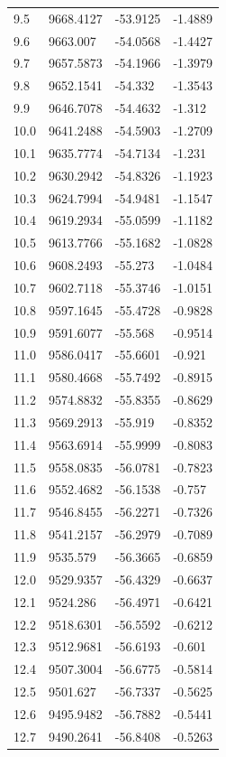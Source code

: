 \begin{table}[H]
\begin{tabular}{llll}
9.5 & 9668.4127 & -53.9125 & -1.4889 \\
9.6 & 9663.007 & -54.0568 & -1.4427 \\
9.7 & 9657.5873 & -54.1966 & -1.3979 \\
9.8 & 9652.1541 & -54.332 & -1.3543 \\
9.9 & 9646.7078 & -54.4632 & -1.312 \\
10.0 & 9641.2488 & -54.5903 & -1.2709 \\
10.1 & 9635.7774 & -54.7134 & -1.231 \\
10.2 & 9630.2942 & -54.8326 & -1.1923 \\
10.3 & 9624.7994 & -54.9481 & -1.1547 \\
10.4 & 9619.2934 & -55.0599 & -1.1182 \\
10.5 & 9613.7766 & -55.1682 & -1.0828 \\
10.6 & 9608.2493 & -55.273 & -1.0484 \\
10.7 & 9602.7118 & -55.3746 & -1.0151 \\
10.8 & 9597.1645 & -55.4728 & -0.9828 \\
10.9 & 9591.6077 & -55.568 & -0.9514 \\
11.0 & 9586.0417 & -55.6601 & -0.921 \\
11.1 & 9580.4668 & -55.7492 & -0.8915 \\
11.2 & 9574.8832 & -55.8355 & -0.8629 \\
11.3 & 9569.2913 & -55.919 & -0.8352 \\
11.4 & 9563.6914 & -55.9999 & -0.8083 \\
11.5 & 9558.0835 & -56.0781 & -0.7823 \\
11.6 & 9552.4682 & -56.1538 & -0.757 \\
11.7 & 9546.8455 & -56.2271 & -0.7326 \\
11.8 & 9541.2157 & -56.2979 & -0.7089 \\
11.9 & 9535.579 & -56.3665 & -0.6859 \\
12.0 & 9529.9357 & -56.4329 & -0.6637 \\
12.1 & 9524.286 & -56.4971 & -0.6421 \\
12.2 & 9518.6301 & -56.5592 & -0.6212 \\
12.3 & 9512.9681 & -56.6193 & -0.601 \\
12.4 & 9507.3004 & -56.6775 & -0.5814 \\
12.5 & 9501.627 & -56.7337 & -0.5625 \\
12.6 & 9495.9482 & -56.7882 & -0.5441 \\
12.7 & 9490.2641 & -56.8408 & -0.5263 \\

\end{tabular}
\end{table}
